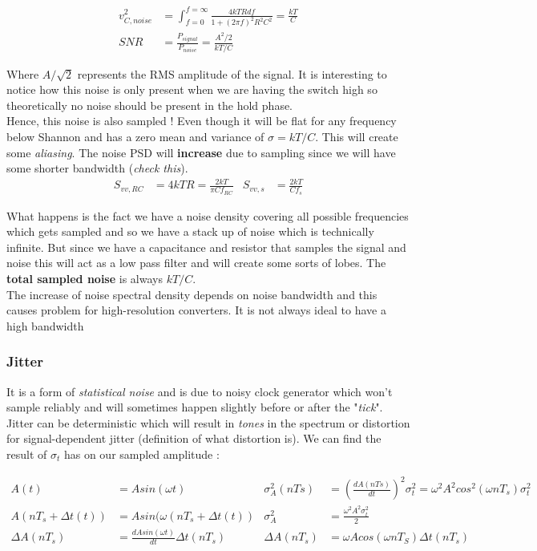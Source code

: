 \documentclass[
  a4paper,
]{article}
\begin{document}
\[\begin{aligned}
    v_{C,noise}^2 &= \int_{f=0}^{f=\infty} \frac{4kTR df}{1 + (2\pi f)^2R^2C^2} = \frac{kT}{C}\\
    SNR &= \frac{P_{signal}}{P_{noise}} = \frac{A^2/2}{kT/C}
\end{aligned}\]

Where \(A/\sqrt{2}\) represents the RMS amplitude of the signal. It is
interesting to notice how this noise is only present when we are having
the switch high so theoretically no noise should be present in the hold
phase.\\
Hence, this noise is also sampled ! Even though it will be flat for any
frequency below Shannon and has a zero mean and variance of
\(\sigma = kT/C\). This will create some \emph{aliasing}. The noise PSD
will \textbf{increase} due to sampling since we will have some shorter
bandwidth (\emph{check this}). \[\begin{aligned}
    S_{vv,RC} &= 4kTR = \frac{2kT}{\pi C f_{RC}} & S_{vv,s} &= \frac{2kT}{Cf_s}
\end{aligned}\]

What happens is the fact we have a noise density covering all possible
frequencies which gets sampled and so we have a stack up of noise which
is technically infinite. But since we have a capacitance and resistor
that samples the signal and noise this will act as a low pass filter and
will create some sorts of lobes. The \textbf{total sampled noise} is
always \(kT/C\).\\
The increase of noise spectral density depends on noise bandwidth and
this causes problem for high-resolution converters. It is not always
ideal to have a high bandwidth

\hypertarget{jitter}{%
\subsubsection{Jitter}\label{jitter}}

It is a form of \emph{statistical noise} and is due to noisy clock
generator which won't sample reliably and will sometimes happen slightly
before or after the "\emph{tick}". Jitter can be deterministic which
will result in \emph{tones} in the spectrum or distortion for
signal-dependent jitter (definition of what distortion is). We can find
the result of \(\sigma_t\) has on our sampled amplitude :

\[\begin{aligned}
    A(t) &= A sin(\omega t) & \sigma_A^2(nTs) &= \left(\frac{dA(nTs)}{dt}\right)^2 \sigma_t^2 = \omega^2A^2 cos^2(\omega nT_s)\sigma_t^2\\
    A(nT_s+\Delta t(t)) &= A sin(\omega (nT_s + \Delta t(t)) & \sigma_A^2 &= \frac{\omega^2 A^2 \sigma_t^2}{2}\\ 
    \Delta A(nT_s) &= \frac{d A sin(\omega t)}{dt} \Delta t(nT_s) & \Delta A(nT_s) &=  \omega A cos(\omega nT_S)\Delta t(nT_s) 
\end{aligned}\]
\end{document}
